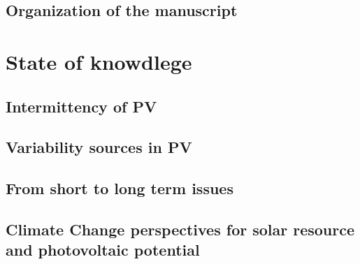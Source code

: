 \section{Organization of the manuscript}


\chapter{State of knowdlege\label{cha:state}}
\section{Intermittency of PV}
\section{Variability sources in PV}
\section{From short to long term issues}
\section{Climate Change perspectives for solar resource and photovoltaic potential}

%